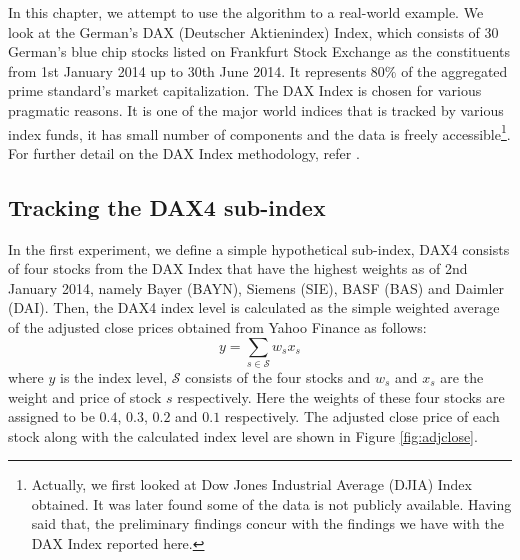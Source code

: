 
In this chapter, we attempt to use the algorithm to a real-world example. We look at the German's DAX (Deutscher Aktienindex) Index, which consists of 30 German's blue chip stocks listed on Frankfurt Stock Exchange as the constituents from 1st January 2014 up to 30th June 2014. It represents $80\%$ of the aggregated prime standard's market capitalization. The DAX Index is chosen for various pragmatic reasons. It is one of the major world indices that is tracked by various index funds, it has small number of components and the data is freely accessible\footnote{Actually, we first looked at Dow Jones Industrial Average (DJIA) Index obtained. It was later found some of the data is not publicly available. Having said that, the preliminary findings concur with the findings we have with the DAX Index reported here.}. For further detail on the DAX Index methodology, refer \cite{DAX14}.
 
\subsection{Tracking the DAX4 sub-index}
In the first experiment, we define a simple hypothetical sub-index, DAX4 consists of four stocks from the DAX Index that have the highest weights as of 2nd January 2014, namely Bayer (BAYN), Siemens (SIE), BASF (BAS) and Daimler (DAI). Then, the DAX4 index level is calculated as the simple weighted average of the adjusted close prices obtained from Yahoo Finance as follows:
\begin{equation}
  y = \sum_{s \in \mathcal{S}} w_s x_s
\end{equation}
where $y$ is the index level, $\mathcal{S}$ consists of the four stocks and  $w_s$ and $x_s$ are the weight and price of stock $s$ respectively. Here the weights of these four stocks are assigned to be $0.4$, $0.3$, $0.2$ and $0.1$ respectively. The adjusted close price of each stock along with the calculated index level are shown in Figure \ref{fig:adjclose}.
 
